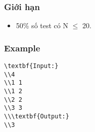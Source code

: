 \subsubsection{   Giới hạn  }
\begin{itemize}
	\item     50\% số test có N  $\le$  20.   
\end{itemize}

\subsubsection{   Example  }
\begin{verbatim}
\textbf{Input:}
\\4
\\1 1
\\1 2
\\2 2
\\3 3
\\\textbf{Output:}
\\3\end{verbatim}
